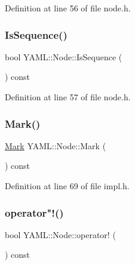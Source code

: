 Definition at line 56 of file node.\+h.

\mbox{\label{class_y_a_m_l_1_1_node_ad550e0b444c8a2c3b9cc6342a87a2118}} 
\subsubsection{\texorpdfstring{IsSequence()}{IsSequence()}}
{\footnotesize\ttfamily bool Y\+A\+M\+L\+::\+Node\+::\+Is\+Sequence (\begin{DoxyParamCaption}{ }\end{DoxyParamCaption}) const\hspace{0.3cm}{\ttfamily [inline]}}



Definition at line 57 of file node.\+h.

\mbox{\label{class_y_a_m_l_1_1_node_ade805ae8e338c7026add709e8d6c3f24}} 
\subsubsection{\texorpdfstring{Mark()}{Mark()}}
{\footnotesize\ttfamily \mbox{\hyperlink{struct_y_a_m_l_1_1_mark}{Mark}} Y\+A\+M\+L\+::\+Node\+::\+Mark (\begin{DoxyParamCaption}{ }\end{DoxyParamCaption}) const\hspace{0.3cm}{\ttfamily [inline]}}



Definition at line 69 of file impl.\+h.

\mbox{\label{class_y_a_m_l_1_1_node_acf62c3257292c6d67945835785a01497}} 
\subsubsection{\texorpdfstring{operator"!()}{operator!()}}
{\footnotesize\ttfamily bool Y\+A\+M\+L\+::\+Node\+::operator! (\begin{DoxyParamCaption}{ }\end{DoxyParamCaption}) const\hspace{0.3cm}{\ttfamily [inline]}}



